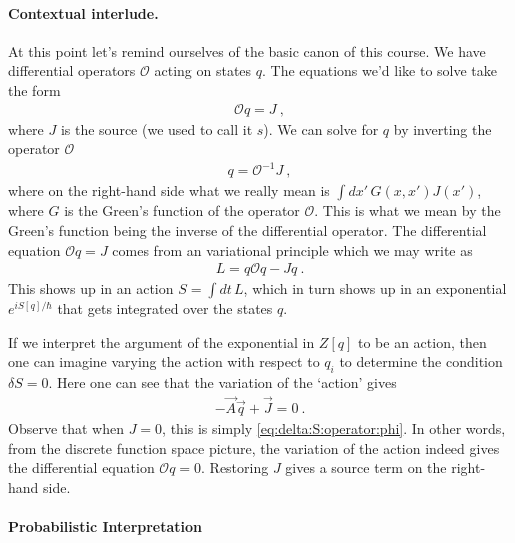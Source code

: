 \paragraph{Contextual interlude.} At this point let's remind ourselves of the basic canon of this course. We have differential operators $\mathcal O$ acting on states $q$. The equations we'd like to solve take the form
\begin{align}
	\mathcal O q = J \ ,
\end{align}
where $J$ is the source (we used to call it $s$). We can solve for $q$ by inverting the operator $\mathcal O$
\begin{align}
	q = \mathcal O^{-1} J \ ,
\end{align}
where on the right-hand side what we really mean is $\int dx'\, G(x,x') J(x')$, where $G$ is the Green's function of the operator $\mathcal O$. This is what we mean by the Green's function being the inverse of the differential operator. The differential equation $\mathcal O q = J$ comes from an variational principle which we may write as
\begin{align}
	L = q \mathcal O q - Jq \ .
\end{align}
This shows up in an action $S=\int dt\, L$, which in turn shows up in an exponential $e^{iS[q]/\hbar}$ that gets integrated over the states $q$. 

\begin{example}
\label{eg:varying:discrete:action}
If we interpret the argument of the exponential in $Z[q]$ to be an action, then one can imagine varying the action with respect to $q_i$ to determine the condition $\delta S = 0$. Here one can see that the variation of the `action' gives
\begin{align}
	-\vec{A} \vec{q} + \vec{J} = 0 \ .
\end{align}
Observe that when $J=0$, this is simply \eqref{eq:delta:S:operator:phi}. In other words, from the discrete function space picture, the variation of the action indeed gives the differential equation $\mathcal O q = 0$. Restoring $J$ gives a source term on the right-hand side.
\end{example}

\paragraph{Probabilistic Interpretation}

